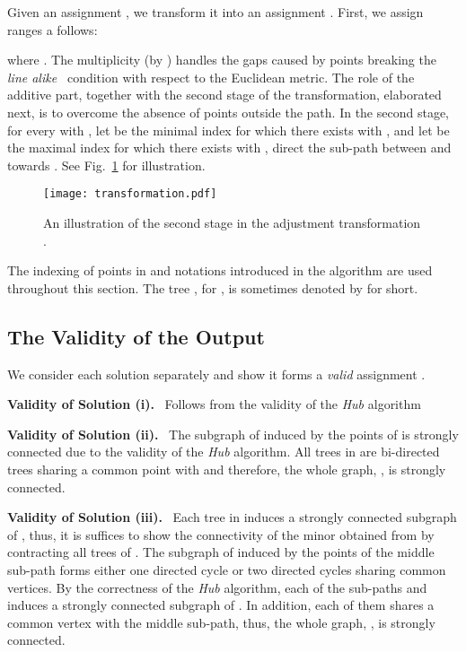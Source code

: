 \documentclass[a4paper]{article}
\newcommand{\orderedline}{line alike}
\begin{document}
\begin{algorithm}[htp]
\begin{algorithmic}
\begin{description}[topsep=0.2cm, itemsep=0.1cm]
\item[The \emph{adjustment} transformation .]
Given an assignment , 
we transform it into an assignment . First, we assign ranges a follows:

\end{description}

where .
The multiplicity (by ) handles the gaps caused by points breaking the \emph{\orderedline\ } condition with respect to the Euclidean metric. 
The role of the additive part, together with
the second stage of the transformation, elaborated next, is to overcome the absence of points outside the path.
In the second stage, 
for every  with , let  be the minimal index
for which there exists  with ,
and let  be the maximal index
for which there exists  with ,
direct the sub-path between  and  towards .
See Fig.~\ref{fig:transformation} for illustration.
\begin{figure}[htb]
    \centering
        \texttt{[image: transformation.pdf]}
    \caption{An illustration of the second stage in the adjustment transformation .}
    \label{fig:transformation}
\end{figure}

The indexing of points in  and notations introduced in the algorithm are used throughout this section.
The tree , for , is sometimes denoted by  for short.
\subsection{The Validity of the Output}\label{sec:validity}
We consider each solution separately and show it forms a \emph{valid} assignment .


\noindent
\textbf{Validity of Solution (i).} \
Follows from the validity of the \emph{Hub} algorithm


\noindent
\textbf{Validity of Solution (ii).} \ 
The subgraph of  induced by the points of  is strongly connected due to the validity of the \emph{Hub} algorithm.
All trees in  are bi-directed trees sharing a common point with 
and therefore, the whole graph, , is strongly connected. 

\noindent
\textbf{Validity of Solution (iii).} \
Each tree in  induces a strongly connected subgraph of ,
thus, it is suffices to show the connectivity of the minor obtained from 
by contracting all trees of .
The subgraph of  induced by the points of the middle sub-path  
forms either one directed cycle or two directed cycles sharing common vertices. 
By the correctness of the \emph{Hub} algorithm, each of the sub-paths  and  induces 
a strongly connected subgraph of .
In addition, each of them shares a common vertex with the middle sub-path,
thus, the whole graph, , is strongly connected.


\end{algorithmic}
\end{algorithm}
\end{document}
